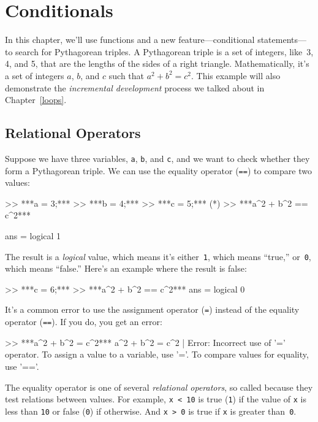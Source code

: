 \chapter{Conditionals}

In this chapter, we'll use functions and a new feature---conditional statements---to search for Pythagorean triples.
A Pytha\-gorean triple is a set of integers, like~3, 4, and 5,
that are the lengths of the sides of a right triangle.  Mathematically, it's a set of integers $a$, $b$, and $c$ such that $a^2 + b^2 = c^2$.
This example will also demonstrate the \emph{incremental development} process we talked about in Chapter~\ref{loops}.


\section{Relational Operators}

Suppose we have three variables, \lstinline{a}, \lstinline{b}, and \lstinline{c}, and we want to check whether they form a Pythagorean triple.  We can use the equality operator (\lstinline{==}) to compare two values:

\begin{code}
>> ***a = 3;***
>> ***b = 4;***
>> ***c = 5;***
(*\pagebreak*)
>> ***a^2 + b^2 == c^2***

ans = logical 1
\end{code}

The result is a \emph{logical} value, which means it's either~\lstinline{1}, which means ``true,'' or~\lstinline{0}, which means ``false.''  Here's an example where the result is false:

\begin{code}
>> ***c = 6;***
>> ***a^2 + b^2 == c^2***
ans = logical 0
\end{code}

It's a common error to use the assignment operator (\lstinline{=}) instead of the equality operator (\lstinline{==}).  If you do, you get an error:

\begin{code}
>> ***a^2 + b^2 = c^2***
 a^2 + b^2 = c^2
           |
Error: Incorrect use of '=' operator. 
To assign a value to a variable, use '='. 
To compare values for equality, use '=='.
\end{code}

The equality operator is one of several \emph{relational operators}, so called because they test relations between values.
For example, \lstinline{x < 10} is true (\lstinline{1}) if the value of \lstinline{x} is less than \lstinline{10} or false (\lstinline{0}) if otherwise.  And \lstinline{x > 0} is true if \lstinline{x} is greater than~\lstinline{0}.


